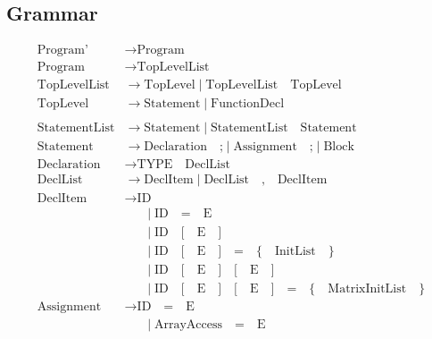 \documentclass[letterpaper,12pt,oneside]{article}
\begin{document}
\subsection{Grammar}
\begin{align*}
\text{Program'} &\rightarrow \text{Program} \\
\text{Program} &\rightarrow \text{TopLevelList} \\
\text{TopLevelList} &\rightarrow \text{TopLevel} \mid \text{TopLevelList} \quad \text{TopLevel} \\
\text{TopLevel} &\rightarrow \text{Statement} \mid \text{FunctionDecl} \\
\\
\text{StatementList} &\rightarrow \text{Statement} \mid \text{StatementList} \quad \text{Statement} \\
\text{Statement} &\rightarrow \text{Declaration} \quad \texttt{;} \mid \text{Assignment} \quad \texttt{;} \mid \text{Block} \\
\text{Declaration} &\rightarrow \text{TYPE} \quad \text{DeclList} \\
\text{DeclList} &\rightarrow \text{DeclItem} \mid \text{DeclList} \quad \texttt{,} \quad \text{DeclItem} \\
\text{DeclItem} &\rightarrow \text{ID} \\
                &\mathrel{\phantom{\rightarrow}} \mid \text{ID} \quad \texttt{=} \quad \text{E} \\
                &\mathrel{\phantom{\rightarrow}} \mid \text{ID} \quad \texttt{[} \quad \text{E} \quad \texttt{]} \\
                &\mathrel{\phantom{\rightarrow}} \mid \text{ID} \quad \texttt{[} \quad \text{E} \quad \texttt{]} \quad \texttt{=} \quad \texttt{\{} \quad \text{InitList} \quad \texttt{\}} \\
                &\mathrel{\phantom{\rightarrow}} \mid \text{ID} \quad \texttt{[} \quad \text{E} \quad \texttt{]} \quad \texttt{[} \quad \text{E} \quad \texttt{]} \\
                &\mathrel{\phantom{\rightarrow}} \mid \text{ID} \quad \texttt{[} \quad \text{E} \quad \texttt{]} \quad \texttt{[} \quad \text{E} \quad \texttt{]} \quad \texttt{=} \quad \texttt{\{} \quad \text{MatrixInitList} \quad \texttt{\}} \\
\text{Assignment} &\rightarrow \text{ID} \quad \texttt{=} \quad \text{E} \\
                  &\mathrel{\phantom{\rightarrow}} \mid \text{ArrayAccess} \quad \texttt{=} \quad \text{E} \\

\end{align*}
\end{document}
